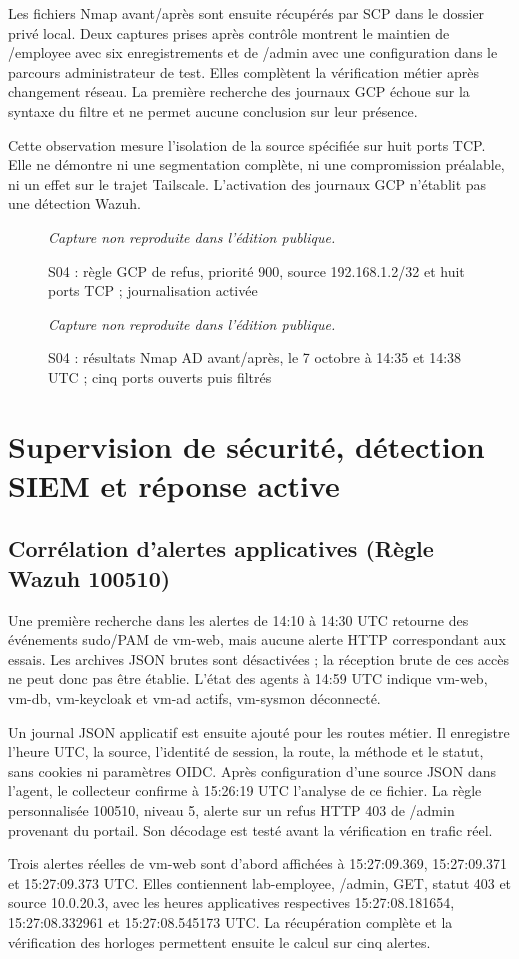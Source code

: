 \documentclass[a4paper,12pt]{report}
\newcommand{\publiccapture}[1]{%
  \begin{figure}[H]\centering
  {\footnotesize\itshape Capture non reproduite dans l'édition publique.}
  \caption{#1}\end{figure}}
\begin{document}
Les fichiers Nmap avant/après sont ensuite récupérés par SCP dans le dossier privé local. Deux captures prises après contrôle montrent le maintien de /employee avec six enregistrements et de /admin avec une configuration dans le parcours administrateur de test. Elles complètent la vérification métier après changement réseau. La première recherche des journaux GCP échoue sur la syntaxe du filtre et ne permet aucune conclusion sur leur présence.

Cette observation mesure l'isolation de la source spécifiée sur huit ports TCP. Elle ne démontre ni une segmentation complète, ni une compromission préalable, ni un effet sur le trajet Tailscale. L'activation des journaux GCP n'établit pas une détection Wazuh.

\publiccapture{S04 : règle GCP de refus, priorité 900, source 192.168.1.2/32 et huit ports TCP ; journalisation activée}
\publiccapture{S04 : résultats Nmap AD avant/après, le 7 octobre à 14:35 et 14:38 UTC ; cinq ports ouverts puis filtrés}

\section{Supervision de sécurité, détection SIEM et réponse active}
\label{sec:p4-siem}
\subsection{Corrélation d'alertes applicatives (Règle Wazuh 100510)}
Une première recherche dans les alertes de 14:10 à 14:30 UTC retourne des événements sudo/PAM de vm-web, mais aucune alerte HTTP correspondant aux essais. Les archives JSON brutes sont désactivées ; la réception brute de ces accès ne peut donc pas être établie. L'état des agents à 14:59 UTC indique vm-web, vm-db, vm-keycloak et vm-ad actifs, vm-sysmon déconnecté.

Un journal JSON applicatif est ensuite ajouté pour les routes métier. Il enregistre l'heure UTC, la source, l'identité de session, la route, la méthode et le statut, sans cookies ni paramètres OIDC. Après configuration d'une source JSON dans l'agent, le collecteur confirme à 15:26:19 UTC l'analyse de ce fichier. La règle personnalisée 100510, niveau 5, alerte sur un refus HTTP 403 de /admin provenant du portail. Son décodage est testé avant la vérification en trafic réel.

Trois alertes réelles de vm-web sont d'abord affichées à 15:27:09.369, 15:27:09.371 et 15:27:09.373 UTC. Elles contiennent lab-employee, /admin, GET, statut 403 et source 10.0.20.3, avec les heures applicatives respectives 15:27:08.181654, 15:27:08.332961 et 15:27:08.545173 UTC. La récupération complète et la vérification des horloges permettent ensuite le calcul sur cinq alertes.
\end{document}
